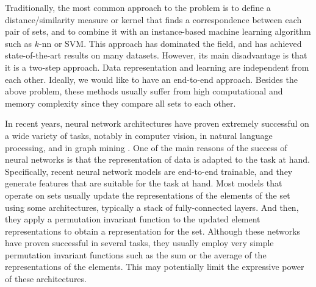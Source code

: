 \documentclass[twoside]{article}
\begin{document}
Traditionally, the most common approach to the problem is to define a distance/similarity measure or kernel that finds a correspondence between each pair of sets, and to combine it with an instance-based machine learning algorithm such as $k$-nn or SVM.
This approach has dominated the field, and has achieved state-of-the-art results on many datasets.
However, its main disadvantage is that it is a two-step approach.
Data representation and learning are independent from each other.
Ideally, we would like to have an end-to-end approach.
Besides the above problem, these methods usually suffer from high computational and memory complexity since they compare all sets to each other.

In recent years, neural network architectures have proven extremely successful on a wide variety of tasks, notably in computer vision, in natural language processing, and in graph mining \citep{lecun2015deep}.
One of the main reasons of the success of neural networks is that the representation of data is adapted to the task at hand.
Specifically, recent neural network models are end-to-end trainable, and they generate features that are suitable for the task at hand.
Most models that operate on sets usually update the representations of the elements of the set using some architectures, typically a stack of fully-connected layers.
And then, they apply a permutation invariant function to the updated element representations to obtain a representation for the set.
Although these networks have proven successful in several tasks, they usually employ very simple permutation invariant functions such as the sum or the average of the representations of the elements.
This may potentially limit the expressive power of these architectures.
\end{document}
